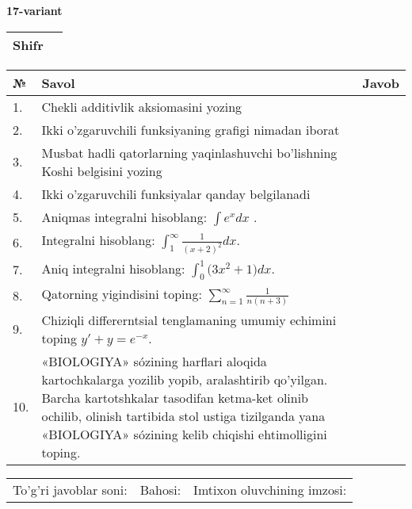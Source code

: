 \documentclass{article}
\begin{document}
  \egroup
  
  \newpage
  
  
  \textbf{17-variant}\\
  
  \bgroup
  \def\arraystretch{1.6} %
  
  \begin{tabular}{|m{5.7cm}|m{9.5cm}|}
  \hline
  Shifr & \\
  \hline
  \end{tabular}
  
  \vspace{1cm}
  
  \begin{tabular}{|m{0.7cm}|m{10cm}|m{4cm}|}
  \hline
  № & Savol & Javob \\
  \hline
  1. & Chekli additivlik aksiomasini yozing &  \\
  \hline
  2. & Ikki o'zgaruvchili funksiyaning grafigi nimadan iborat &  \\
  \hline
  3. & Musbat hadli qatorlarning yaqinlashuvchi bo'lishning Koshi belgisini yozing &  \\
  \hline
  4. & Ikki o'zgaruvchili funksiyalar qanday belgilanadi &  \\
  \hline
  5. & Aniqmas integralni hisoblang: \(\int {e^{x}dx}\) . &  \\
  \hline
  6. & Integralni hisoblang: \(\int_{1}^{\infty}{\frac{1}{(x + 2)^{2}}dx}\). &  \\
  \hline
  7. & Aniq integralni hisoblang: \(\int_{0}^{1}{(3x^{2}} + 1)dx\). &  \\
  \hline
  8. & Qatorning yigindisini toping: \(\sum_{n = 1}^{\infty}\frac{1}{n(n + 3)}\) &  \\
  \hline
  9. & Chiziqli differerntsial tenglamaning umumiy echimini toping \(y' + y = e^{- x}\). &  \\
  \hline
  10. & «BIOLOGIYA» sózining harflari aloqida kartochkalarga yozilib yopib, aralashtirib qo'yilgan. Barcha kartotshkalar tasodifan ketma-ket olinib ochilib, olinish tartibida stol ustiga tizilganda yana «BIOLOGIYA» sózining kelib chiqishi ehtimolligini toping. &  \\
  \hline
  \end{tabular}
  
  \vspace{1cm}
  
  \begin{tabular}{lll}
  To'g'ri javoblar soni: \underline{\hspace{1.5cm}} & 
  Bahosi: \underline{\hspace{1.5cm}} & 
  Imtixon oluvchining imzosi: \underline{\hspace{2cm}} \\
  \end{tabular}
  
\end{document}

